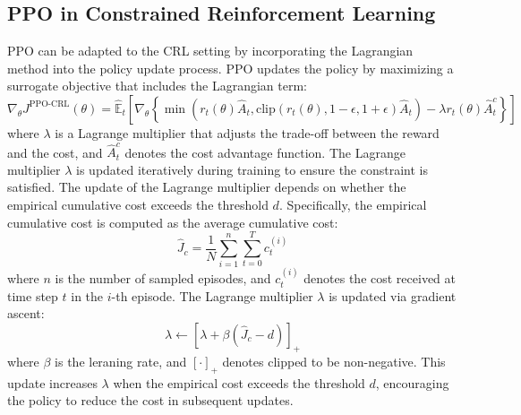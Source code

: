 \subsection{PPO in Constrained Reinforcement Learning}

PPO can be adapted to the CRL setting by incorporating the Lagrangian method into the policy update process.
PPO updates the policy by maximizing a surrogate objective that includes the Lagrangian term:
\begin{equation}
  \nabla_\theta J^{\text{PPO-CRL}}(\theta) = \hat{\mathbb{E}}_t \left[ \nabla_\theta \left\{ \min \left( r_t(\theta)\hat{A}_t, \text{clip}(r_t(\theta), 1 - \epsilon, 1 + \epsilon)\hat{A}_t \right) - \lambda r_t(\theta)\hat{A}^c_t \right\} \right]
\end{equation}
where $\lambda$ is a Lagrange multiplier that adjusts the trade-off between the reward and the cost, and  $\hat{A}^c_t$ denotes the cost advantage function.
The Lagrange multiplier $\lambda$ is updated iteratively during training to ensure the constraint is satisfied.
The update of the Lagrange multiplier depends on whether the empirical cumulative cost exceeds the threshold $d$.
Specifically, the empirical cumulative cost is computed as the average cumulative cost:
\begin{equation}
  \hat{J}_c = \frac{1}{N} \sum^n_{i = 1} \sum^T_{t = 0}  c^{(i)}_t
\end{equation}
where $n$ is the number of sampled episodes, and $c^{(i)}_t$ denotes the cost received at time step $t$ in the $i$-th episode.
The Lagrange multiplier $\lambda$ is updated via gradient ascent:
\begin{equation}
  \lambda \leftarrow \left[ \lambda + \beta\left( \hat{J}_c - d \right) \right]_+
\end{equation}
where $\beta$ is the leraning rate, and $[\cdot]_+$ denotes clipped to be non-negative.
This update increases $\lambda$ when the empirical cost exceeds the threshold $d$, encouraging the policy to reduce the cost in subsequent updates.

